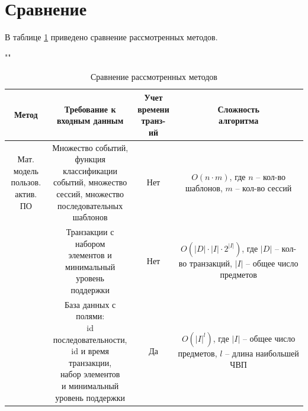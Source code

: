 \newpage
\section{Сравнение}

В таблице \ref{tab} приведено сравнение рассмотренных методов.

\begin{table}[H]
	\begin{center}
		\caption{Сравнение рассмотренных методов}
		\label{tab}
		""\newline
		\begin{tabular}{ | c | c | c | c | }
			\hline
			Метод & \specialcell{Требование к\\ входным данным}  & \specialcell{Учет\\времени \\транз-ий} & \specialcell{Сложность\\алгоритма} \\ \hline
			
			\specialcell{Мат. модель\\пользов.\\актив. ПО} & \specialcell{Множество событий,\\функция классификации\\событий, множество\\сессий, множество\\последовательных\\шаблонов} & Нет & \specialcell{$O(n \cdot m)$, где $n$ --\\кол-во шаблонов,\\$m$ -- кол-во сессий} \\ \hline
			
			\specialcell{Apriori} & \specialcell{Транзакции с набором\\элементов и\\минимальный уровень\\поддержки} & Нет & \specialcell{$O(|D| \cdot |I| \cdot 2^{|I|})$,\\где $|D|$ -- кол-во\\транзакций,\\$|I|$ -- общее число\\предметов} \\ \hline
			
			\specialcell{GSP} & \specialcell{База данных с полями:\\id последовательности,\\id и время транзакции,\\набор элементов\\и минимальный\\уровень поддержки} & Да & \specialcell{$O(|I|^l)$, где $|I|$ --\\общее число\\предметов,\\$l$ -- длина\\наибольшей ЧВП} \\ \hline
			

\end{tabular}
\end{center}
\end{table}
